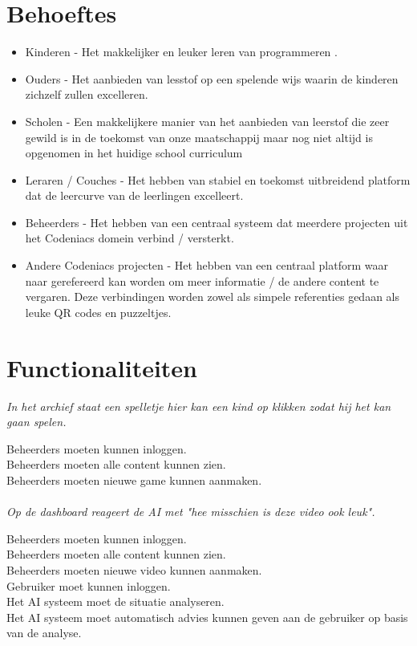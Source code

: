\documentclass[]{report}
\begin{document}
\chapter{Behoeftes}

\begin{itemize}
	\item Kinderen - Het makkelijker en leuker leren van programmeren .	
	\item Ouders - Het aanbieden van lesstof op een spelende wijs waarin de kinderen zichzelf zullen excelleren. 
	\item Scholen - Een makkelijkere manier van het aanbieden van leerstof die zeer gewild is in de toekomst van onze maatschappij maar nog niet altijd is opgenomen in het huidige school curriculum
	\item Leraren / Couches - Het hebben van stabiel en toekomst uitbreidend platform dat de leercurve van de leerlingen excelleert. 
	\item Beheerders - Het hebben van een centraal systeem dat meerdere projecten uit het Codeniacs domein verbind / versterkt.
	\item Andere Codeniacs projecten - Het hebben van een centraal platform waar naar gerefereerd kan worden om meer informatie / de andere content te vergaren. Deze verbindingen worden zowel als simpele referenties gedaan als leuke QR codes en puzzeltjes.
	
\end{itemize}






\chapter{Functionaliteiten}

\textit{In het archief staat een spelletje hier kan een kind op klikken zodat hij het kan gaan spelen.}

Beheerders moeten kunnen inloggen. \\
Beheerders moeten alle content kunnen zien. \\
Beheerders moeten nieuwe game kunnen aanmaken. \\
\\

\textit{Op de dashboard reageert de AI met "hee misschien is deze video ook leuk".}

Beheerders moeten kunnen inloggen. \\
Beheerders moeten alle content kunnen zien. \\
Beheerders moeten nieuwe video kunnen aanmaken. \\
Gebruiker moet kunnen inloggen. \\ 
Het AI systeem moet de situatie analyseren. \\
Het AI systeem moet automatisch advies kunnen geven aan de gebruiker op basis van de analyse. \\
\\
\end{document}
